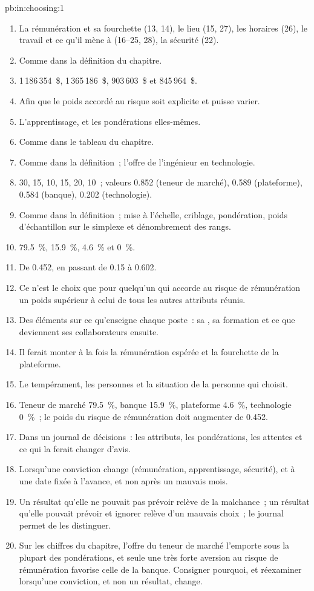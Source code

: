 \begin{solution}{pb:in:choosing:1}
\begin{enumerate}
\item La rémunération et sa fourchette (13, 14), le lieu (15, 27), les horaires (26), le travail et ce qu'il mène à (16--25, 28), la sécurité (22).
\item Comme dans la définition du chapitre.
\item 1\,186\,354~\$, 1\,365\,186~\$, 903\,603~\$ et 845\,964~\$.
\item Afin que le poids accordé au risque soit explicite et puisse varier.
\item L'apprentissage, et les pondérations elles-mêmes.
\item Comme dans le tableau du chapitre.
\item Comme dans la définition~; l'offre de l'ingénieur en technologie.
\item 30, 15, 10, 15, 20, 10~; valeurs 0.852 (teneur de marché), 0.589 (plateforme), 0.584 (banque), 0.202 (technologie).
\item Comme dans la définition~; mise à l'échelle, criblage, pondération, poids d'échantillon sur le simplexe et dénombrement des rangs.
\item 79.5~\%, 15.9~\%, 4.6~\% et 0~\%.
\item De 0.452, en passant de 0.15 à 0.602.
\item Ce n'est le choix que pour quelqu'un qui accorde au risque de rémunération un poids supérieur à celui de tous les autres attributs réunis.
\item Des éléments sur ce qu'enseigne chaque poste~: sa , sa formation et ce que deviennent ses collaborateurs ensuite.
\item Il ferait monter à la fois la rémunération espérée et la fourchette de la plateforme.
\item Le tempérament, les personnes et la situation de la personne qui choisit.
\item Teneur de marché 79.5~\%, banque 15.9~\%, plateforme 4.6~\%, technologie 0~\%~; le poids du risque de rémunération doit augmenter de 0.452.
\item Dans un journal de décisions~: les attributs, les pondérations, les attentes et ce qui la ferait changer d'avis.
\item Lorsqu'une conviction change (rémunération, apprentissage, sécurité), et à une date fixée à l'avance, et non après un mauvais mois.
\item Un résultat qu'elle ne pouvait pas prévoir relève de la malchance~; un résultat qu'elle pouvait prévoir et ignorer relève d'un mauvais choix~; le
journal permet de les distinguer.
\item Sur les chiffres du chapitre, l'offre du teneur de marché l'emporte sous la plupart des pondérations, et seule une très forte aversion
au risque de rémunération favorise celle de la banque. Consigner pourquoi, et réexaminer lorsqu'une conviction, et non un résultat, change.
\end{enumerate}
\end{solution}

